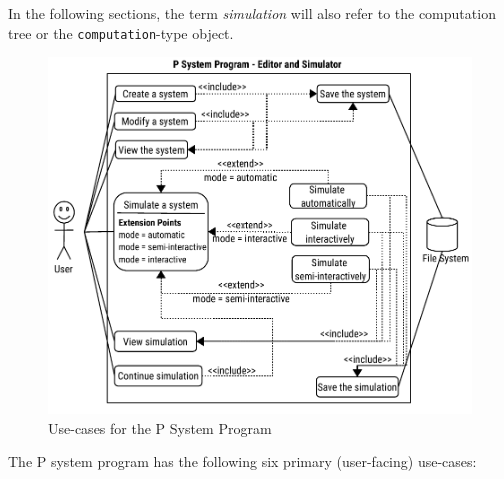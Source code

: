 \documentclass{article}
\begin{document}
In the following sections, the term \textit{simulation} will also refer to the computation tree or
the \texttt{computation}-type object.

\begin{figure}[H]
\begin{center}
    \includegraphics[scale=0.85]{figures/zzz-interaction-model.pdf}
    \caption{Use-cases for the P System Program}
    \label{fig:use-case}
\end{center}
\end{figure}

The P system program has the following six primary (user-facing) use-cases:
\end{document}
